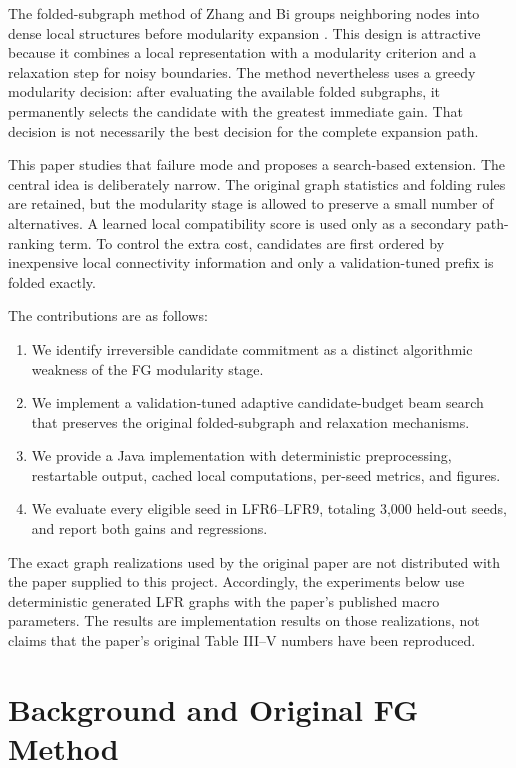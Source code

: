 \documentclass[10pt,journal,compsoc]{IEEEtran}
\begin{document}
The folded-subgraph method of Zhang and Bi groups neighboring nodes into dense
local structures before modularity expansion \cite{zhang2025fg}. This design
is attractive because it combines a local representation with a modularity
criterion and a relaxation step for noisy boundaries. The method nevertheless
uses a greedy modularity decision: after evaluating the available folded
subgraphs, it permanently selects the candidate with the greatest immediate
gain. That decision is not necessarily the best decision for the complete
expansion path.

This paper studies that failure mode and proposes a search-based extension.
The central idea is deliberately narrow. The original graph statistics and
folding rules are retained, but the modularity stage is allowed to preserve a
small number of alternatives. A learned local compatibility score is used only
as a secondary path-ranking term. To control the extra cost, candidates are
first ordered by inexpensive local connectivity information and only a
validation-tuned prefix is folded exactly.

The contributions are as follows:
\begin{enumerate}
  \item We identify irreversible candidate commitment as a distinct algorithmic
  weakness of the FG modularity stage.
  \item We implement a validation-tuned adaptive candidate-budget beam search
  that preserves the original folded-subgraph and relaxation mechanisms.
  \item We provide a Java implementation with deterministic preprocessing,
  restartable output, cached local computations, per-seed metrics, and figures.
  \item We evaluate every eligible seed in LFR6--LFR9, totaling 3,000 held-out
  seeds, and report both gains and regressions.
\end{enumerate}

The exact graph realizations used by the original paper are not distributed
with the paper supplied to this project. Accordingly, the experiments below
use deterministic generated LFR graphs with the paper's published macro
parameters. The results are implementation results on those realizations, not
claims that the paper's original Table III--V numbers have been reproduced.

\section{Background and Original FG Method}
\end{document}
